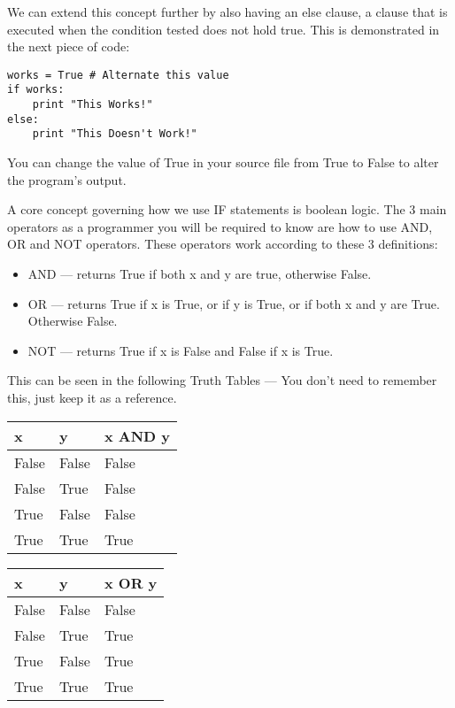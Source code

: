 \documentclass[twocolumn]{article}
\begin{document}
We can extend this concept further by also having an else clause, a clause that is executed when the condition tested does not hold true. This is demonstrated in the next piece of code:
\begin{lstlisting}
works = True # Alternate this value
if works:
	print "This Works!"
else:
	print "This Doesn't Work!"
\end{lstlisting}
You can change the value of True in your source file from True to False to alter the program's output.

A core concept governing how we use IF statements is boolean logic. The 3 main operators as a programmer you will be required to know are how to use AND, OR and NOT operators. These operators work according to these 3 definitions:
\begin{itemize}
	\item AND --- returns True if both x and y are true, otherwise False. 
	\item OR --- returns True if x is True, or if y is True, or if both x and y are True. Otherwise False.
	\item NOT --- returns True if x is False and False if x is True.
\end{itemize}
This can be seen in the following Truth Tables --- You don't need to remember this, just keep it as a reference.

\begin{center}
	\begin{tabular}{lll} 
		\toprule
		x & y & x AND y \\
		\midrule
		False & False & False \\
		False & True & False \\
		True & False & False \\
		True & True & True \\
		\bottomrule
	\end{tabular}
	\quad
	\begin{tabular}{lll} 
		\toprule
		x & y & x OR y \\
		\midrule
		False & False & False \\
		False & True & True \\
		True & False & True \\
		True & True & True \\
		\bottomrule
	\end{tabular}
\end{center}
\end{document}
